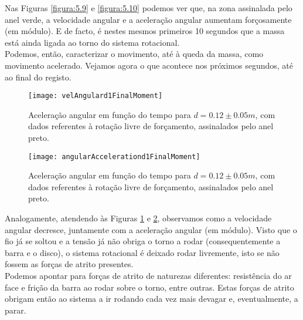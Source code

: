 \documentclass[11pt]{report}
\begin{document}
Nas Figuras \ref{figura:5.9} e \ref{figura:5.10} podemos ver que, na zona assinalada pelo anel verde, a velocidade angular e a aceleração angular aumentam forçosamente (em módulo). E de facto, é nestes mesmos primeiros 10 segundos que a massa está ainda ligada ao torno do sistema rotacional.\\
Podemos, então, caracterizar o movimento, até à queda da massa, como movimento acelerado. Vejamos agora o que acontece nos próximos segundos, até ao final do registo.

\begin{figure} [H]
\center
\texttt{[image: velAngulard1FinalMoment]}
\caption{Aceleração angular em função do tempo para $d=0.12\pm0.05 m $, com dados referentes à rotação livre de forçamento, assinalados pelo anel preto. \label{figura:5.11}}
\end{figure}

\begin{figure} [H]
\center
\texttt{[image: angularAccelerationd1FinalMoment]}
\caption{Aceleração angular em função do tempo para $d=0.12\pm0.05 m $, com dados referentes à rotação livre de forçamento, assinalados pelo anel preto. \label{figura:5.12}}
\end{figure}

Analogamente, atendendo às Figuras \ref{figura:5.11} e \ref{figura:5.12}, observamos como a velocidade angular decresce, juntamente com a aceleração angular (em módulo). Visto que o fio já se soltou e a tensão já não obriga o torno a rodar (consequentemente a barra e o disco), o sistema rotacional é deixado rodar livremente, isto se não fossem as forças de atrito presentes. \\
Podemos apontar para forças de atrito de naturezas diferentes: resistência do ar face e frição da barra ao rodar sobre o torno, entre outras. Estas forças de atrito obrigam então ao sistema a ir rodando cada vez mais devagar e, eventualmente, a parar.
\end{document}
